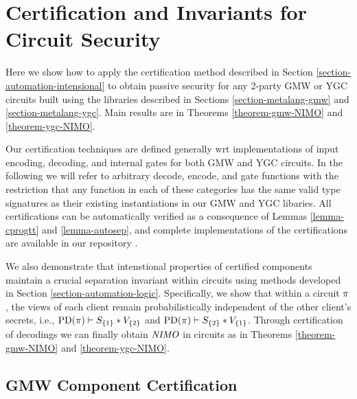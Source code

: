 \section{Certification and Invariants for Circuit Security}
\label{section-composition}

Here we show how to apply the certification method described in
Section \ref{section-automation-intensional} to obtain passive
security for any 2-party GMW or YGC circuits built using the libraries
described in Sections \ref{section-metalang-gmw} and
\ref{section-metalang-ygc}.  Main results are in Theorems
\ref{theorem-gmw-NIMO} and \ref{theorem-ygc-NIMO}.

Our certification techniques are defined generally wrt implementations
of input encoding, decoding, and internal gates for both GMW and YGC
circuits. In the following we will refer to arbitrary decode, encode,
and gate functions with the restriction that any function in each of
these categories has the same valid type signatures as their existing
instantiations in our GMW and YGC libaries. All certifications can be
automatically verified as a consequence of Lemmas \ref{lemma-cprogtt}
and \ref{lemma-autosep}, and complete implementations of the
certifications are available in our repository \cite{jpdf-github}. 

We also demonstrate that intenstional properties of certified
components maintain a crucial separation invariant within circuits
using methods developed in Section \ref{section-automation-logic}.
Specifically, we show that within a circuit $\pi$, the views of each
client remain probabilistically independent of the other client's
secrets, i.e., $\mathrm{PD}(\pi) \vdash S_{\{1\}} * V_{\{2\}}$ and
$\mathrm{PD}(\pi) \vdash S_{\{2\}} * V_{\{1\}}$.
Through certification of decodings we can finally obtain $\mathit{NIMO}$ in
circuits as in Theorems \ref{theorem-gmw-NIMO} and
\ref{theorem-ygc-NIMO}.

\subsection{GMW Component Certification}
\label{section-gmw-certification}

